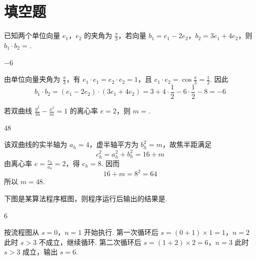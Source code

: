 \section{填空题}

\begin{problem}
已知两个单位向量 \(e_{1}\)，\(e_{2}\) 的夹角为 \( \frac{\pi}{3} \)，若向量 \(b_{1} = e_{1} - 2e_{2}\)，\(b_{2} = 3e_{1} + 4e_{2}\)，则 \( b_{1} \cdot b_{2} = \)\fillinblank{}.
\end{problem}

\begin{answer}
\(-6\)
\end{answer}

\begin{solution}
由单位向量夹角为 \(\frac{\pi}{3}\)，有 \(e_1\cdot e_1=e_2\cdot e_2=1\)，且 \(e_1\cdot e_2=\cos\frac{\pi}{3}=\frac12\). 因此
\[
b_1\cdot b_2=(e_1-2e_2)\cdot(3e_1+4e_2)=3+4\cdot\frac12-6\cdot\frac12-8=-6
\]
\end{solution}

\begin{problem}
若双曲线 \(\frac{y^2}{16} - \frac{x^2}{m} = 1\) 的离心率 \(e = 2\)，则 \(m = \)\fillinblank{}.
\end{problem}

\begin{answer}
\(48\)
\end{answer}

\begin{solution}
该双曲线的实半轴为 \(a_h=4\)，虚半轴平方为 \(b_h^2=m\)，故焦半距满足
\[
c_h^2=a_h^2+b_h^2=16+m
\]
由离心率 \(e=\frac{c_h}{a_h}=2\)，得 \(c_h=8\). 因而
\[
16+m=8^2=64
\]
所以 \(m=48\).
\end{solution}

\begin{problem}
下图是某算法程序框图，则程序运行后输出的结果是\fillinblank{}.

\end{problem}

\begin{answer}
\(6\)
\end{answer}

\begin{solution}
按流程图从 \(s=0\)，\(n=1\) 开始执行. 第一次循环后
\(s=(0+1)\times1=1\)，\(n=2\)
此时 \(s>3\) 不成立，继续循环. 第二次循环后
\(s=(1+2)\times2=6\)，\(n=3\)
此时 \(s>3\) 成立，输出 \(s=6\).
\end{solution}

